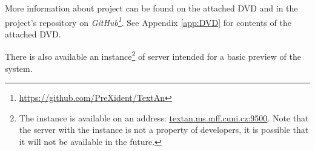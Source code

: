 
More information about \textan{} project can be found on the attached DVD and in
the project's repository on \emph{GitHub\footnote{\url{https://github.com/PreXident/TextAn}}}.
See Appendix \ref{app:DVD} for contents of the attached DVD.

There is also available an instance\footnote{The instance is available on an address:
\url{textan.ms.mff.cuni.cz:9500}. Note that the server with the instance is not
a property of developers, it is possible that it will not be available in the future.}
of \textan{} server intended for a basic preview of the system.

